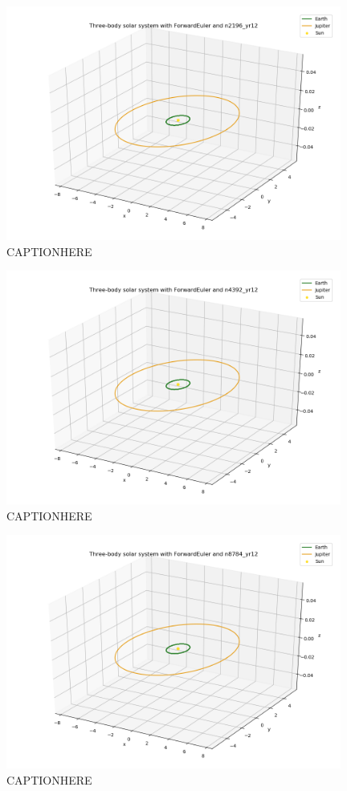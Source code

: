\documentclass{article}
\begin{document}
    \begin{figure}[H]
        \centering
        \includegraphics[width = 11cm]{img/plot3D_S_E_J_F_n2196_yr12.png}
        \caption{CAPTIONHERE}
        \label{fig:plot3D_S_E_J_F_n2196_yr12}
    \end{figure}

    \begin{figure}[H]
        \centering
        \includegraphics[width = 11cm]{img/plot3D_S_E_J_F_n4392_yr12.png}
        \caption{CAPTIONHERE}
        \label{fig:plot3D_S_E_J_F_n4392_yr12}
    \end{figure}

    \begin{figure}[H]
        \centering
        \includegraphics[width = 11cm]{img/plot3D_S_E_J_F_n8784_yr12.png}
        \caption{CAPTIONHERE}
        \label{fig:plot3D_S_E_J_F_n8784_yr12}
    \end{figure}
\end{document}
